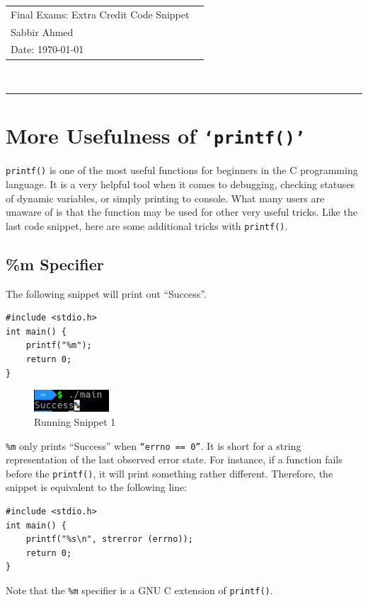 \documentclass[paper=usletter, fontsize=12pt]{extarticle}
\newcommand{\documentinfo}[5]{
    \begin{centering}
        \parbox{2in}{
        \begin{spacing}{1}
            \begin{flushleft}
                \begin{tabular}{l l} #1 \\ #2 \\ #3 \\
                \end{tabular}\\
                \rule{\textwidth}{1pt}
            \end{flushleft}
        \end{spacing} }
    \end{centering} }
\begin{document}
    \documentinfo{Final Exams: Extra Credit Code Snippet}{Sabbir Ahmed}{Date:
    \today}
    \vspace{-0.1in}

    \section{More Usefulness of \texttt{`printf()'}}
    \texttt{printf()} is one of the most useful functions for beginners in the
    C programming language. It is a very helpful tool when it comes to
    debugging, checking statuses of dynamic variables, or simply printing to
    console. What many users are unaware of is that the function may be used
    for other very useful tricks. Like the last code snippet, here are some
    additional tricks with \texttt{printf()}.

    \subsection{\%m Specifier}

    The following snippet will print out ``Success''.

\begin{lstlisting}
#include <stdio.h>
int main() {
    printf("%m");
    return 0;
}
\end{lstlisting}

    \begin{figure}[ht]
        \begin{center}
            \includegraphics[width=0.25\textwidth]{build1.png}
            \caption{Running Snippet 1} \label{fig:build1}
        \end{center}
    \end{figure}

    \texttt{\%m} only prints “Success” when \texttt{“errno == 0”}. It is short
    for a string representation of the last observed error state. For instance,
    if a function fails before the \texttt{printf()}, it will print something
    rather different. Therefore, the snippet is equivalent to the following
    line:

\begin{lstlisting}
#include <stdio.h>
int main() {
    printf("%s\n", strerror (errno));
    return 0;
}
\end{lstlisting}

    Note that the \texttt{\%m} specifier is a GNU C extension of
    \texttt{printf()}.
\end{document}
